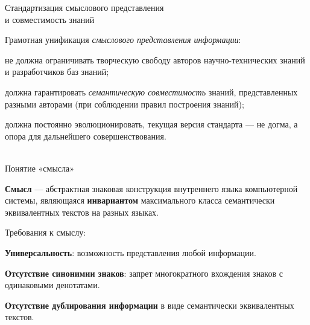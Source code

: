 \begin{frame}{Стандартизация смыслового представления\\и совместимость знаний}
	\topline
	\justifying
	
	Грамотная унификация \textit{смыслового представления информации}:
	\begin{textitemize}
		\item не должна ограничивать творческую свободу авторов научно-технических знаний и разработчиков баз знаний;
		\item должна гарантировать \textit{семантическую совместимость} знаний, представленных разными авторами (при соблюдении правил построения знаний);
		\item должна постоянно эволюционировать, текущая версия стандарта --- не догма, а опора для дальнейшего совершенствования.
	\end{textitemize}
	
\end{frame}


\begin{frame}{\\Понятие «смысла»}
	\topline
	\justifying
	
	\textbf{Смысл} --- абстрактная знаковая конструкция внутреннего языка компьютерной системы, являющаяся \textbf{инвариантом} максимального класса семантически эквивалентных текстов на разных языках.
	
	\medskip
	Требования к смыслу:
	\begin{textitemize}
		\item \textbf{Универсальность}: возможность представления любой информации.
		\item \textbf{Отсутствие синонимии знаков}: запрет многократного вхождения знаков с одинаковыми денотатами.
		\item \textbf{Отсутствие дублирования информации} в виде семантически эквивалентных текстов.
	\end{textitemize}
	
\end{frame}


